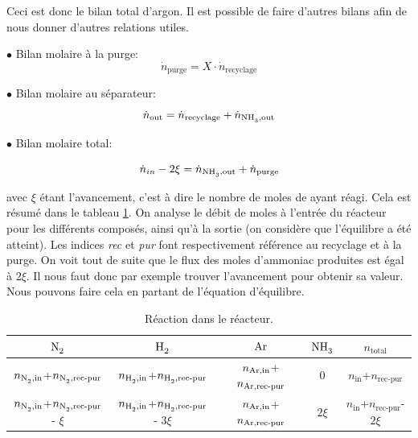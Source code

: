 Ceci est donc le bilan total d'argon. 
Il est possible de faire d'autres bilans afin de nous donner d'autres relations utiles.

$\bullet$ Bilan molaire à la purge:
\begin{equation}
\dot{n}_{\text{purge}} = X \cdot \dot{n}_{\text{recyclage}}
\label{eq:bilan_mol_purge}
\end{equation}

$\bullet$ Bilan molaire au séparateur:
\begin{equation}
\dot{n}_{\text{out}}=\dot{n}_{\text{recyclage}}+\dot{n}_{\ce{NH3},\text{out}}
\label{eq:bilan_mol_sep}
\end{equation}


$\bullet$ Bilan molaire total:

\begin{equation}
	\dot{n}_{in} - 2\xi=\dot{n}_{\ce{NH3},\text{out}} + \dot{n}_{\text{purge}}
	\label{eq:bilan_mol_tot}
\end{equation}

avec $\xi$ étant l'avancement, c'est à dire le nombre de moles de  ayant réagi. 
Cela est résumé dans le tableau \ref{tab:reaction_purge_eq}.
On analyse le débit de moles à l'entrée du réacteur pour les différents composés, 
ainsi qu'à la sortie (on considère que l'équilibre a été atteint). 
Les indices \textit{rec} et \textit{pur} font respectivement référence au recyclage et à la purge. 
On voit tout de suite que le flux des moles d'ammoniac produites est égal à $2 \xi$. Il
nous faut donc par exemple trouver l'avancement pour obtenir sa valeur. Nous pouvons faire
cela en partant de l'équation d'équilibre.

\begin{table}[h!]
	\centering
	\begin{tabular}{c|c|c|c|c}
		$\ce{N2}$ & $\ce{H2}$ & $\ce{Ar}$ & $\ce{NH3}$ & $n_{\text{total}}$ \\
		\hline
		$n_{\ce{N2},\text{in}}$+$n_{\ce{N2},\text{rec-pur}}$ 
		& $n_{\ce{H2},\text{in}}$+$n_{\ce{H2},\text{rec-pur}}$ & 
		$n_{\ce{Ar},\text{in}}$+$n_{\ce{Ar},\text{rec-pur}}$ &
		$0$  & $n_{\text{in}}$+$n_{\text{rec-pur}}$ \\
		$n_{\ce{N2},\text{in}}$+$n_{\ce{N2},\text{rec-pur}}$ - $\xi$ &
		$n_{\ce{H2},\text{in}}$+$n_{\ce{H2},\text{rec-pur}}$ - $3\xi$ & 
		$n_{\ce{Ar},\text{in}}$+$n_{\ce{Ar},\text{rec-pur}}$ & 
		$2 \xi$  & $n_{\text{in}}$+$n_{\text{rec-pur}}$- $2\xi$\\
	\end{tabular}
	\caption{Réaction dans le réacteur.}
	\label{tab:reaction_purge_eq}
\end{table}

